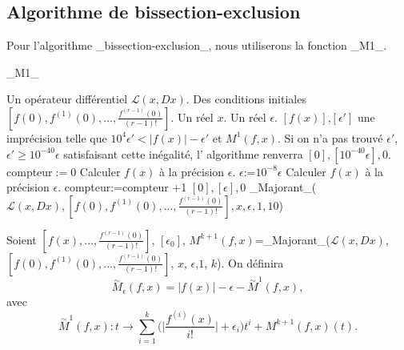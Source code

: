 \documentclass[a4paper,10pt]{article}
\begin{document}
	\subsection{Algorithme de bissection-exclusion}
	Pour l'algorithme \_bissection-exclusion\_, nous utiliserons la fonction \_M1\_.
	\begin{algorithm}
		\caption{\_M1\_}
		\begin{algorithmic}[1]
			\REQUIRE Un opérateur différentiel $\mathcal{L}(x,Dx)$. Des conditions initiales $[f(0),f^{(1)}(0),...,\frac{f^{(r-1)}(0)}{(r-1)!}]$. Un réel $x$. Un réel $\epsilon$.	
			\ENSURE  $[f(x)]$,$[\epsilon']$ une imprécision telle que  $10^{4}\epsilon'<|f(x)|-\epsilon'$ et $M^{1}(f,x)$.  Si on n'a pas trouvé $\epsilon'$, $\epsilon'\geq 10^{-40}\epsilon$ satisfaisant cette inégalité, l' algorithme renverra $[0],[10^{-40}\epsilon],0$.
			\STATE compteur$:=0$
			\STATE Calculer $f(x)$ à la précision $\epsilon$.
			\STATE $\epsilon$:=$10^{-8}\epsilon$
			\STATE Calculer $f(x)$ à la précision $\epsilon$.
			\STATE compteur:=compteur +1
			\ENDWHILE
			\RETURN $[0],[\epsilon],0$ 
			\ELSE
			\RETURN \_Majorant\_($\mathcal{L}(x,Dx),[f(0),f^{(1)}(0),...,\frac{f^{(r-1)}(0)}{(r-1)!}],x,\epsilon,1,10$)
			\ENDIF
		\end{algorithmic}
	\end{algorithm}
	
	
	\begin{definition}
		
	\end{definition}
	Soient $[f(x),...,\frac{f^{(r-1)}(0)}{(r-1)!}]$, $[\epsilon_0]$, $M^{k+1}(f,x)$=\_Majorant\_($\mathcal{L}(x,Dx)$, $[f(0),f^{(1)}(0),...,\frac{f^{(r-1)}(0)}{(r-1)!}]$, $x$, $\epsilon$,$1$, $k$).
	On définira \[\overset{\sim}{M}_{\epsilon}(f,x)=|f(x)|-\epsilon-\overset{\sim}{M}^{1}(f,x),\] avec
	\[\overset{\sim}{M} ^{1}(f,x): t \rightarrow \sum_{i=1}^{k}\Big(\Big|\frac{f^{(i)}(x)}{i!}\Big|+\epsilon_i\Big)t^i+M^{k+1}(f,x)(t).\]
	
\end{document}

